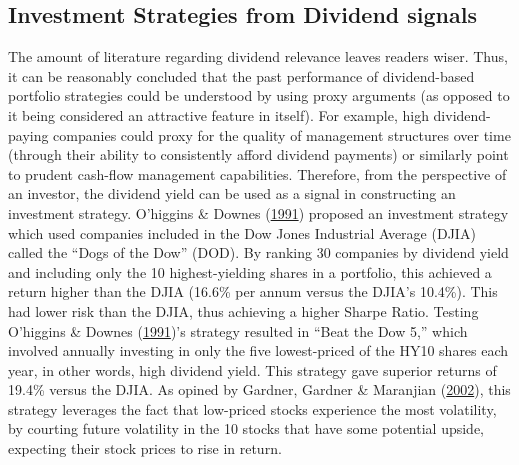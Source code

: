\documentclass[12pt,preprint, authoryear]{elsarticle}
\numberwithin{equation}{section}
\numberwithin{figure}{section}
\numberwithin{table}{section}
\begin{document}
\hypertarget{investment-strategies-from-dividend-signals}{%
\subsection{Investment Strategies from Dividend
signals}\label{investment-strategies-from-dividend-signals}}

The amount of literature regarding dividend relevance leaves readers
wiser. Thus, it can be reasonably concluded that the past performance of
dividend-based portfolio strategies could be understood by using proxy
arguments (as opposed to it being considered an attractive feature in
itself). For example, high dividend-paying companies could proxy for the
quality of management structures over time (through their ability to
consistently afford dividend payments) or similarly point to prudent
cash-flow management capabilities. Therefore, from the perspective of an
investor, the dividend yield can be used as a signal in constructing an
investment strategy. O'higgins \& Downes
(\protect\hyperlink{ref-o1991beating}{1991}) proposed an investment
strategy which used companies included in the Dow Jones Industrial
Average (DJIA) called the ``Dogs of the Dow'' (DOD). By ranking 30
companies by dividend yield and including only the 10 highest-yielding
shares in a portfolio, this achieved a return higher than the DJIA
(16.6\% per annum versus the DJIA's 10.4\%). This had lower risk than
the DJIA, thus achieving a higher Sharpe Ratio. Testing O'higgins \&
Downes (\protect\hyperlink{ref-o1991beating}{1991})'s strategy resulted
in ``Beat the Dow 5,'' which involved annually investing in only the
five lowest-priced of the HY10 shares each year, in other words, high
dividend yield. This strategy gave superior returns of 19.4\% versus the
DJIA. As opined by Gardner, Gardner \& Maranjian
(\protect\hyperlink{ref-gardner2002motley}{2002}), this strategy
leverages the fact that low-priced stocks experience the most
volatility, by courting future volatility in the 10 stocks that have
some potential upside, expecting their stock prices to rise in return.
\end{document}
